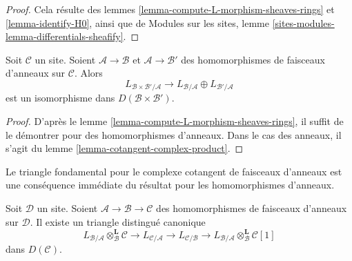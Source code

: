\begin{proof}
Cela résulte des lemmes \ref{lemma-compute-L-morphism-sheaves-rings} et
\ref{lemma-identify-H0}, ainsi que de Modules sur les sites, lemme
\ref{sites-modules-lemma-differentials-sheafify}.
\end{proof}

\begin{lemma}
\label{lemma-compute-L-product-sheaves-rings}
Soit $\mathcal{C}$ un site. Soient $\mathcal{A} \to \mathcal{B}$ et
$\mathcal{A} \to \mathcal{B}'$ des homomorphismes de faisceaux d'anneaux sur
$\mathcal{C}$. Alors
$$
L_{\mathcal{B} \times \mathcal{B}'/\mathcal{A}}
\longrightarrow
L_{\mathcal{B}/\mathcal{A}} \oplus L_{\mathcal{B}'/\mathcal{A}}
$$
est un isomorphisme dans $D(\mathcal{B} \times \mathcal{B}')$.
\end{lemma}

\begin{proof}
D'après le lemme \ref{lemma-compute-L-morphism-sheaves-rings}, il suffit de le
démontrer pour des homomorphismes d'anneaux. Dans le cas des anneaux, il s'agit
du lemme \ref{lemma-cotangent-complex-product}.
\end{proof}

\noindent
Le triangle fondamental pour le complexe cotangent de faisceaux d'anneaux est
une conséquence immédiate du résultat pour les homomorphismes d'anneaux.

\begin{lemma}
\label{lemma-triangle-sheaves-rings}
Soit $\mathcal{D}$ un site. Soient
$\mathcal{A} \to \mathcal{B} \to \mathcal{C}$ des homomorphismes de faisceaux
d'anneaux sur $\mathcal{D}$. Il existe un triangle distingué canonique
$$
L_{\mathcal{B}/\mathcal{A}} \otimes_\mathcal{B}^\mathbf{L} \mathcal{C}
\to L_{\mathcal{C}/\mathcal{A}} \to L_{\mathcal{C}/\mathcal{B}} \to
L_{\mathcal{B}/\mathcal{A}} \otimes_\mathcal{B}^\mathbf{L} \mathcal{C}[1]
$$
dans $D(\mathcal{C})$.
\end{lemma}

